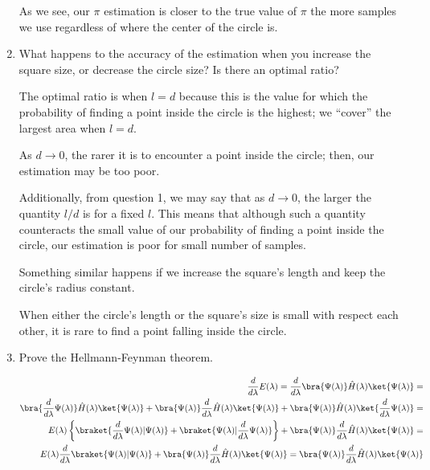 \documentclass[12pt,letterpaper]{report}
\newcommand{\lam}{\lambda}
\begin{document}
\begin{enumerate}
		As we see, our $\pi$ estimation is closer to the true value of $\pi$ the more samples we use regardless of where the center of the circle is. 
		
		\item
		What happens to the accuracy of the estimation when you increase the square size, or decrease the circle size? Is there an optimal ratio?
		
		The optimal ratio is when $l = d$ because this is the value for which the probability  of finding a point inside the circle is the highest; we “cover” the largest area when $l = d$. 
		
		As $d \rightarrow 0$, the rarer it is to encounter a point inside the circle; then, our estimation may be too poor.
		
		Additionally, from question 1, we may say that as $d \rightarrow 0$, the larger the quantity $l/d$ is for a fixed $l$. This means that although such a quantity counteracts the small value of our probability of finding a point inside the circle, our estimation is poor for small number of samples.
		
		Something similar happens if we increase the square's length and keep the circle's radius constant.
		
		When either the circle's length or the square's size is small with respect each other, it is rare to find a point falling inside the circle.
		
		\item
		Prove the Hellmann-Feynman theorem. 
		
		\begin{equation*}
		\begin{aligned}
			\dfrac{d}{d\lam} E(\lam) =
			\dfrac{d}{d\lam} \bra{  \Psi(\lam)} \hat{H}(\lam) \ket{ \Psi(\lam)} =\\
			 \bra{  \dfrac{d}{d\lam}  \Psi(\lam)} \hat{H}(\lam)  \ket{  \Psi(\lam)} +
			 \bra{ \Psi(\lam)} \dfrac{d}{d\lam} \hat{H}(\lam)  \ket{  \Psi(\lam)} + 
			 \bra{ \Psi(\lam)} \hat{H}(\lam) \ket{ \dfrac{d}{d\lam} \Psi(\lam)} = \\
			 E(\lam)
			 \left\{  
			 \braket{ \dfrac{d}{d\lam}\Psi(\lam) | \Psi(\lam)} + \braket{\Psi(\lam)| \dfrac{d}{d\lam} \Psi(\lam)}
			 \right\} + 	\bra{ \Psi(\lam)} \dfrac{d}{d\lam} \hat{H}(\lam)  \ket{  \Psi(\lam)}= \\
			 E(\lam) \dfrac{d}{d\lam} \braket{ \Psi(\lam) | \Psi(\lam)} 	+ \bra{ \Psi(\lam)} \dfrac{d}{d\lam} \hat{H}(\lam)  \ket{  \Psi(\lam)} = 
			 \bra{ \Psi(\lam)} \dfrac{d}{d\lam} \hat{H}(\lam)  \ket{  \Psi(\lam)} 
		\end{aligned}			
		\end{equation*}
	

\end{enumerate}
\end{document}
